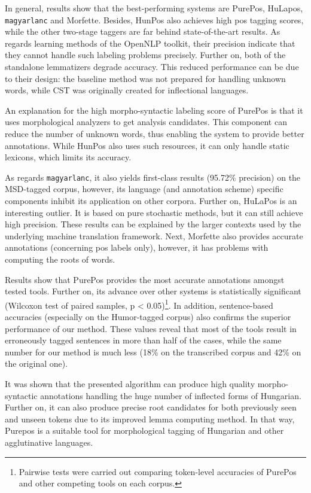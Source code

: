 In general, results show that the best-performing systems are PurePos, HuLapos, \texttt{magyarlanc} and Morfette.
Besides, HunPos also achieves high \acrshort{pos} tagging scores, while the other two-stage taggers are far behind state-of-the-art results. 
As regards learning methods of the OpenNLP toolkit, their precision indicate that they cannot handle such labeling problems precisely.
Further on, both of the standalone lemmatizers degrade accuracy. 
This reduced performance can be due to their design: the baseline method was not prepared for handling unknown words, while CST was originally created for inflectional languages. 

An explanation for the high morpho-syntactic labeling score of PurePos is that it uses morphological analyzers to get analysis candidates. 
This component can reduce the number of unknown words, thus enabling the system to provide better annotations.
While HunPos also uses such resources, it can only handle static lexicons, which limits its accuracy.

As regards \texttt{magyarlanc}, it also yields first-class results (95.72\% precision) on the MSD-tagged corpus, however, its language (and annotation scheme) specific components inhibit its application on other corpora. 
Further on, HuLaPos is an interesting outlier.
It is based on pure stochastic methods, but it can still achieve high precision. 
These results can be explained by the larger contexts used by the underlying machine translation framework.
Next, Morfette also provides accurate annotations (concerning \acrshort{pos} labels only), however, it has problems with computing the roots of words.

Results show that PurePos provides the most accurate annotations amongst tested tools.
Further on, its advance over other systems is statistically significant (Wilcoxon test of paired samples, p < 0.05)\footnote{Pairwise tests were carried out comparing token-level accuracies of PurePos and other competing tools on each corpus.}.
In addition, sentence-based accuracies (especially on the Humor-tagged corpus) also confirms the superior performance of our method. 
These values reveal that most of the tools result in erroneously tagged sentences in more than half of the cases, while the same number for our method is much less (18\% on the transcribed corpus and 42\% on the original one). 

It was shown that the presented algorithm can produce high quality morpho-syntactic annotations handling the huge number of inflected forms of Hungarian.
Further on, it can also produce precise root candidates for both previously seen and unseen tokens due to its improved lemma computing method.
In that way, Purepos is a suitable tool for morphological tagging of Hungarian and other agglutinative languages.
%

